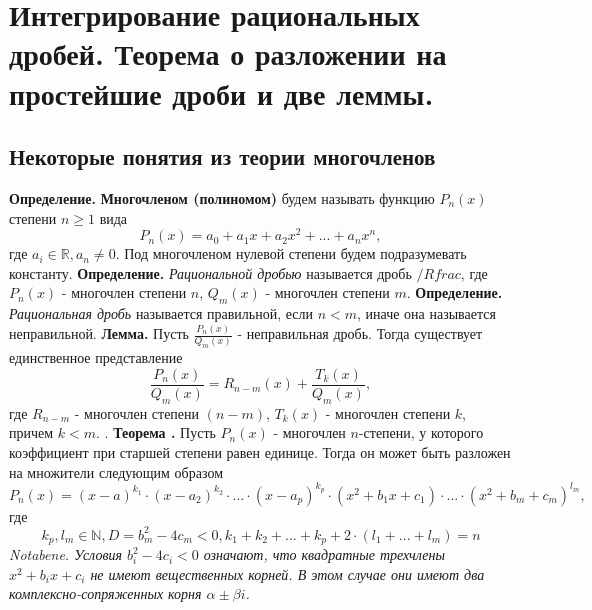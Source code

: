 \documentclass{article}
\newcommand*{\lemma}[1]{\textbf{Лемма.} #1. \newline}
\newcommand*{\theorem}[2]{\textbf{Теорема #1. } #2 \newline}
\newcommand*{\notabene}[1]{\textit{Notabene. #1.} \newline}
\newcommand*{\definition}[1]{\textbf{Определение.} #1 \newline}
\newcommand*{\p}[1][n]{P_{#1}(x)}
\newcommand*{\Q}[1][m]{Q_{#1}(x)}
\newcommand*{\Rfrac}[2]{\frac{\p{#1}}{\Q{#2}}}
\begin{document}
\section{Интегрирование рациональных дробей. Теорема о разложении на простейшие дроби и две леммы.}
\subsection{Некоторые понятия из теории многочленов}
\definition{\textbf{Многочленом (полиномом)} будем называть функцию $\p$ степени $n\geq1$ вида
$$
    \p = a_0 + a_1x + a_2x^2 + ... + a_nx^n,
$$
где $a_i \in \mathbb{R}, a_n \neq 0$. Под многочленом нулевой степени будем подразумевать константу.
}
\definition{\textit{Рациональной дробью} называется дробь $/Rfrac{}{}$, где $\p$ - многочлен степени $n$, $\Q{}$ - многочлен степени $m$.}
\definition{\textit{Рациональная дробь} называется правильной, если $n < m$, иначе она называется неправильной.}
\lemma{Пусть $\Rfrac{}{}$ - неправильная дробь. Тогда существует единственное представление 
$$
    \Rfrac{}{} = R_{n - m}(x) + \frac{T_k(x)}{Q_m(x)},
$$
где $R_{n - m}$ - многочлен степени $(n - m)$, $T_k(x)$ - многочлен степени $k$, причем $k < m$.
}
\theorem{}{Пусть $\p$ - многочлен $n$-степени, у которого коэффициент при старшей степени равен единице. Тогда он может быть разложен на множители следующим образом
$$
    \p = (x - a)^{k_1} \cdot (x-a_2)^{k_2}\cdot...\cdot (x - a_p)^{k_p} \cdot (x^2 + b_1x + c_1) \cdot ... \cdot (x^2 + b_m+c_m)^{l_m},
$$
где
$$
    k_p, l_m \in \mathbb{N}, D = b_m^2 - 4c_m < 0, k_1 + k_2 + ... + k_p + 2 \cdot (l_1 + ... + l_m) = n
$$
}
\notabene{Условия $b_i^2 - 4c_i < 0$ означают, что квадратные трехчлены $x^2 + b_ix + c_i$ не имеют вещественных корней. В этом случае они имеют два комплексно-сопряженных корня $\alpha \pm \beta i$}
\end{document}
